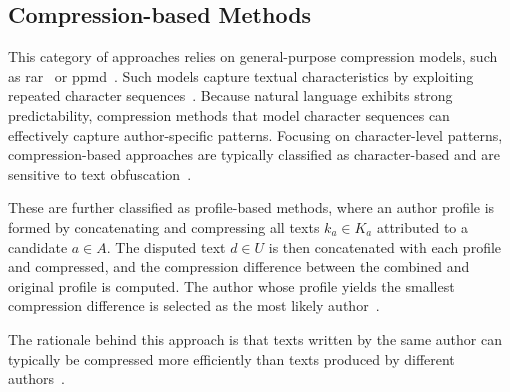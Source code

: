 \subsection{Compression-based Methods}
\label{subsec:compression_based}

This category of approaches relies on general-purpose compression models, such as \ac{rar}~\citep{rar_2004} or \ac{ppmd}~\citep{ppm_2001}. %
Such models capture textual characteristics by exploiting repeated character sequences~\citep{stamatatos_survey_2009,neal_surveying_2018}. 
Because natural language exhibits strong predictability, compression methods that model character sequences can effectively capture author-specific patterns.
Focusing on character-level patterns, compression-based approaches are typically classified as character-based and are sensitive to text obfuscation~\citep{bevendorff_divergence_based_2020}.

These are further classified as profile-based methods, where an author profile is formed by concatenating and compressing all texts $k_a \in K_a$ attributed to a candidate $a \in A$. 
The disputed text $d \in U$ is then concatenated with each profile and compressed, and the compression difference between the combined and original profile is computed. 
The author whose profile yields the smallest compression difference is selected as the most likely author~\citep{stamatatos_survey_2009,elmanarelbouanani_authorship_2014,neal_surveying_2018}.

The rationale behind this approach is that texts written by the same author can typically be compressed more efficiently than texts produced by different authors~\citep{stamatatos_survey_2009,elmanarelbouanani_authorship_2014}.


